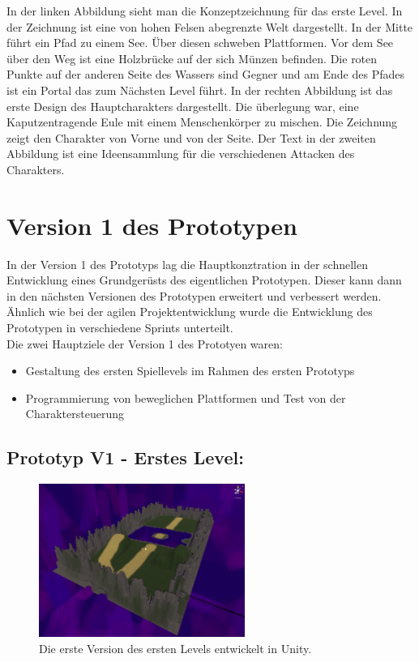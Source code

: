   In der linken Abbildung sieht man die Konzeptzeichnung für das erste Level. In der Zeichnung ist eine von hohen Felsen abegrenzte Welt dargestellt. In der Mitte führt ein Pfad zu einem See. Über diesen schweben Plattformen. Vor dem See über den Weg ist eine Holzbrücke auf der sich Münzen befinden. Die roten Punkte auf der anderen Seite des Wassers sind Gegner und am Ende des Pfades ist ein Portal das zum Nächsten Level führt.
  In der rechten Abbildung ist das erste Design des Hauptcharakters dargestellt. Die überlegung war, eine Kaputzentragende Eule mit einem Menschenkörper zu mischen. Die Zeichnung zeigt den Charakter von Vorne und von der Seite. Der Text in der zweiten Abbildung ist eine Ideensammlung für die verschiedenen Attacken des Charakters. 
\pagebreak

\section{Version 1 des Prototypen}
In der Version 1 des Prototyps lag die Hauptkonztration in der schnellen Entwicklung eines Grundgerüsts des eigentlichen Prototypen. Dieser kann dann in den nächsten Versionen des Prototypen erweitert und verbessert werden. Ähnlich wie bei der agilen Projektentwicklung wurde die Entwicklung des Prototypen in verschiedene \glqq Sprints \grqq unterteilt. \\

Die zwei Hauptziele der Version 1 des Prototyen waren: 
\begin{itemize}
  \item Gestaltung des ersten Spiellevels im Rahmen des ersten Prototyps
  \item Programmierung von beweglichen Plattformen und Test von der Charaktersteuerung
\end{itemize}

\subsection{Prototyp V1 - Erstes Level:}

\begin{figure}[h]
  \centering
  \includegraphics*[width=0.6\textwidth]{chapters/04/images/V1/V1.png}
  \caption{Die erste Version des ersten Levels entwickelt in Unity.}
  \label{fig:PE03}
\end{figure}


